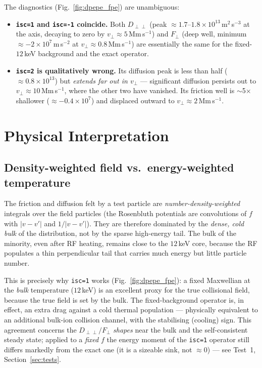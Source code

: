 \documentclass[11pt,a4paper]{article}
\begin{document}
The diagnostics (Fig.~\ref{fig:dpepe_fpe}) are unambiguous:

\begin{itemize}
  \item \textbf{\texttt{isc=1} and \texttt{isc=-1} coincide.} Both
        $D_{\perp\perp}$ (peak $\approx 1.7$--$1.8\times10^{13}$\,m$^2$\,s$^{-3}$
        at the axis, decaying to zero by $v_\perp \approx 5$\,Mm\,s$^{-1}$) and
        $F_\perp$ (deep well, minimum $\approx -2\times10^{7}$\,m\,s$^{-2}$ at
        $v_\perp \approx 0.8$\,Mm\,s$^{-1}$) are essentially the same for the
        fixed-$12$\,keV background and the exact operator.

  \item \textbf{\texttt{isc=2} is qualitatively wrong.} Its diffusion peak is
        less than half ($\approx 0.8\times10^{13}$) but \emph{extends far out
        in $v_\perp$} --- significant diffusion persists out to
        $v_\perp \approx 10$\,Mm\,s$^{-1}$, where the other two have vanished.
        Its friction well is $\sim$5$\times$ shallower
        ($\approx -0.4\times10^{7}$) and displaced outward to
        $v_\perp \approx 2$\,Mm\,s$^{-1}$.
\end{itemize}

\section{Physical Interpretation}

\subsection{Density-weighted field vs.\ energy-weighted temperature}

The friction and diffusion felt by a test particle are
\emph{number-density-weighted} integrals over the field particles (the
Rosenbluth potentials are convolutions of $f$ with $|v-v'|$ and $1/|v-v'|$).
They are therefore dominated by the \emph{dense, cold bulk} of the
distribution, not by the sparse high-energy tail. The bulk of the minority,
even after RF heating, remains close to the $12$\,keV core, because the RF
populates a thin perpendicular tail that carries much energy but little
particle number.

This is precisely why \texttt{isc=1} works (Fig.~\ref{fig:dpepe_fpe}): a fixed
Maxwellian at the \emph{bulk} temperature ($12$\,keV) is an excellent proxy
for the true collisional field, because the true field is set by the bulk. The
fixed-background operator is, in effect, an extra drag against a cold thermal
population --- physically equivalent to an additional bulk-ion collision
channel, with the stabilising (cooling) sign. This agreement concerns the
$D_{\perp\perp}/F_\perp$ \emph{shapes} near the bulk and the self-consistent
steady state; applied to a \emph{fixed} $f$ the energy moment of the
\texttt{isc=1} operator still differs markedly from the exact one (it is a
sizeable sink, not $\approx0$) --- see Test~1, Section~\ref{sec:tests}.
\end{document}
